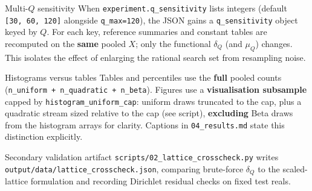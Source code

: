 \documentclass[
  ignorenonframetext,
]{beamer}
\begin{document}
\begin{frame}[fragile]{Multi-\(Q\) sensitivity}
\protect{}\label{multi-q-sensitivity}
When \texttt{experiment.q\_sensitivity} lists integers (default
\texttt{{[}30,\ 60,\ 120{]}} alongside \texttt{q\_max=120}), the JSON
gains a \texttt{q\_sensitivity} object keyed by \(Q\). For each key,
reference summaries and constant tables are recomputed on the
\textbf{same} pooled \(X\); only the functional \(\delta_Q\) (and
\(\mu_Q\)) changes. This isolates the effect of enlarging the rational
search set from resampling noise.
\end{frame}

\begin{frame}[fragile]{Histograms versus tables}
\protect{}\label{histograms-versus-tables}
Tables and percentiles use the \textbf{full} pooled counts
(\texttt{n\_uniform\ +\ n\_quadratic\ +\ n\_beta}). Figures use a
\textbf{visualisation subsample} capped by
\texttt{histogram\_uniform\_cap}: uniform draws truncated to the cap,
plus a quadratic stream sized relative to the cap (see script),
\textbf{excluding} Beta draws from the histogram arrays for clarity.
Captions in \texttt{04\_results.md} state this distinction explicitly.
\end{frame}

\begin{frame}[fragile]{Secondary validation artifact}
\protect{}\label{secondary-validation-artifact}
\texttt{scripts/02\_lattice\_crosscheck.py} writes
\texttt{output/data/lattice\_crosscheck.json}, comparing brute-force
\(\delta_Q\) to the scaled-lattice formulation and recording Dirichlet
residual checks on fixed test reals.
\end{frame}
\end{document}
